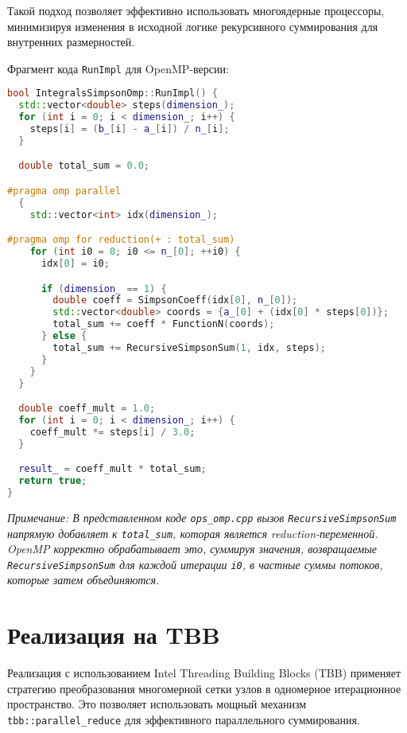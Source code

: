 \documentclass[a4paper,12pt]{article}
\begin{document}
Такой подход позволяет эффективно использовать многоядерные процессоры, минимизируя изменения в исходной логике рекурсивного суммирования для внутренних размерностей.

Фрагмент кода \texttt{RunImpl} для OpenMP-версии:
\begin{lstlisting}[language=C++, caption=Фрагмент RunImpl для OMP-реализации (ops\_omp.cpp), basicstyle=\ttfamily\scriptsize]
bool IntegralsSimpsonOmp::RunImpl() {
  std::vector<double> steps(dimension_);
  for (int i = 0; i < dimension_; i++) {
    steps[i] = (b_[i] - a_[i]) / n_[i];
  }

  double total_sum = 0.0;

#pragma omp parallel
  {
    std::vector<int> idx(dimension_);

#pragma omp for reduction(+ : total_sum)
    for (int i0 = 0; i0 <= n_[0]; ++i0) {
      idx[0] = i0;

      if (dimension_ == 1) {
        double coeff = SimpsonCoeff(idx[0], n_[0]);
        std::vector<double> coords = {a_[0] + (idx[0] * steps[0])};
        total_sum += coeff * FunctionN(coords);
      } else {
        total_sum += RecursiveSimpsonSum(1, idx, steps);
      }
    }
  }

  double coeff_mult = 1.0;
  for (int i = 0; i < dimension_; i++) {
    coeff_mult *= steps[i] / 3.0;
  }

  result_ = coeff_mult * total_sum;
  return true;
}
\end{lstlisting}
\textit{Примечание: В представленном коде \texttt{ops\_omp.cpp} вызов \texttt{RecursiveSimpsonSum} напрямую добавляет к \texttt{total\_sum}, которая является reduction-переменной. OpenMP корректно обрабатывает это, суммируя значения, возвращаемые \texttt{RecursiveSimpsonSum} для каждой итерации \texttt{i0}, в частные суммы потоков, которые затем объединяются.}

\newpage
\section{Реализация на TBB}
\label{sec:tbb_implementation}

Реализация с использованием Intel Threading Building Blocks (TBB) применяет стратегию преобразования многомерной сетки узлов в одномерное итерационное пространство. Это позволяет использовать мощный механизм \texttt{tbb::parallel\_reduce} для эффективного параллельного суммирования.
\end{document}
